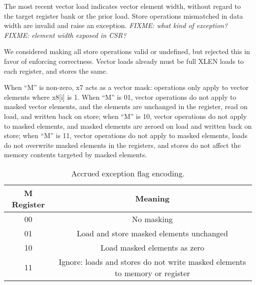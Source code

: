 The most recent vector load indicates vector element width, without regard to the
target register bank or the prior load.  Store operations mismatched in data
width are invalid and raise an exception. {\em FIXME: what kind of exception?}
{\em FIXME:  element width exposed in CSR?}

\begin{commentary}
    We considered making all store operations valid or undefined, but rejected
    this in favor of enforcing correctness.  Vector loads already must be full
    XLEN loads to each register, and stores the same.
\end{commentary}

When ``M'' is non-zero, x7 acts as a vector mask:  operations only apply to vector
elements where x8[i] is 1.  When ``M'' is 01, vector operations do not apply to masked
vector elements, and the elements are unchanged in the register, read on load, and
written back on store; when ``M'' is 10, vector operations do not apply to masked
elements, and masked elements are zeroed on load and written back on store; when ``M''
is 11, vector operations do not apply to masked elements, loads do not overwrite masked
elements in the registers, and stores do not affect the memory contents targeted by
masked elements.

\begin{table}[htp]
    \begin{small}
        \begin{center}
            \begin{tabular}{cl}
                \hline
                \multicolumn{1}{|c|}{M Register} &
                \multicolumn{1}{c|}{Meaning} \\
                \hline
                \multicolumn{1}{|c|}{00} &
                \multicolumn{1}{c|}{No masking}\\
                \hline
                \multicolumn{1}{|c|}{01} &
                \multicolumn{1}{c|}{Load and store masked elements unchanged}\\
                \hline
                \multicolumn{1}{|c|}{10} &
                \multicolumn{1}{c|}{Load masked elements as zero}\\
                \hline
                \multicolumn{1}{|c|}{11} &
                \multicolumn{1}{c|}{Ignore:  loads and stores do not write masked elements to memory or register}\\
                \hline
            \end{tabular}
        \end{center}
    \end{small}
    \caption{Accrued exception flag encoding.}
    \label{bitdef}
\end{table}

